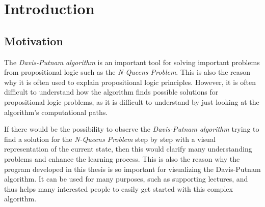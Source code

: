 
\chapter{Introduction}
\label{ch:introduction}

\section{Motivation}
\label{sec:introMotivation}
The \textit{Davis-Putnam algorithm} is an important tool for solving important problems from propositional logic such as the \textit{N-Queens Problem}. This is also the reason why it is often used to explain propositional logic principles. However, it is often difficult to understand how the algorithm finds possible solutions for propositional logic problems, as it is difficult to understand by just looking at the algorithm's computational paths.

If there would be the possibility to observe the \textit{Davis-Putnam algorithm} trying to find a solution for the \textit{N-Queens Problem} step by step with a visual representation of the current state, then this would clarify many understanding problems and enhance the learning process. This is also the reason why the program developed in this thesis is so important for visualizing the Davis-Putnam algorithm. It can be used for many purposes, such as supporting lectures, and thus helps many interested people to easily get started with this complex algorithm.

